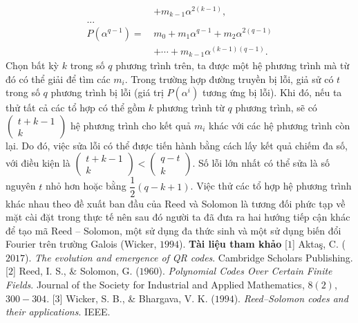 \begin{multicols}{2}
\begin{align*}
		&+m_{k-1} \alpha^{2(k-1)},\\[-0.5ex]
		...&\\[-0.5ex]
		P(\alpha^{q-1})=\,&m_0+m_1 \alpha^{q-1}+m_2 \alpha^{2(q-1)} \\[-0.5ex]
		&+\cdots+m_{k-1} \alpha^{(k-1)(q-1)}. 
	\end{align*}
	Chọn bất kỳ $k$ trong số $q$ phương trình trên, ta được một hệ phương trình mà từ đó có thể giải để tìm các $m_i$.
	\vskip 0.05cm
	Trong trường hợp đường truyền bị lỗi, giả sử có $t$ trong số $q$ phương trình bị lỗi (giá trị $P\left(\alpha^i\right)$ tương ứng bị lỗi). Khi đó, nếu ta thử tất cả các tổ hợp có thể gồm $k$ phương trình từ $q$ phương trình, sẽ có $( \begin{array}{l}
		t + k - 1\\[-0.5ex]
		k
	\end{array})$ hệ phương trình cho kết quả $m_i$ khác với các hệ phương trình còn lại. Do đó, việc sửa lỗi có thể được tiến hành bằng cách lấy kết quả chiếm đa số, với điều kiện là  $( \begin{array}{l}
	t + k - 1\\[-0.5ex]
	k
\end{array}) <( \begin{array}{l}
q - t\\[-0.5ex]
k
\end{array})$. Số lỗi lớn nhất có thể sửa là số nguyên $t$ nhỏ hơn hoặc bằng $\dfrac{1}{2}(q-k+1)$.
\vskip 0.05cm
	Việc thử các tổ hợp hệ phương trình khác nhau theo đề xuất ban đầu của Reed và Solomon là tương đối phức tạp về mặt cài đặt trong thực tế nên sau đó người ta đã đưa ra hai hướng tiếp cận khác để tạo mã Reed -- Solomon, một sử dụng đa thức sinh và một sử dụng biến đổi Fourier trên trường Galois (Wicker, $1994$).
	\vskip 0.05cm
	\textbf{\color{toanhocdoisong}Tài liệu tham khảo}
	\vskip 0.05cm
	[$1$] Aktaş, C. ($2017$). \textit{The evolution and emergence of QR codes}. Cambridge Scholars Publishing.
	\vskip 0.05cm
	[$2$] Reed, I. S., \& Solomon, G. ($1960$). \textit{Polynomial Codes Over Certain Finite Fields}. Journal of the Society for Industrial and Applied Mathematics, $8(2)$, $300-304$. 
	\vskip 0.05cm
	[$3$] Wicker, S. B., \& Bhargava, V. K. ($1994$). \textit{Reed--Solomon codes and their applications}. IEEE.
\end{multicols}